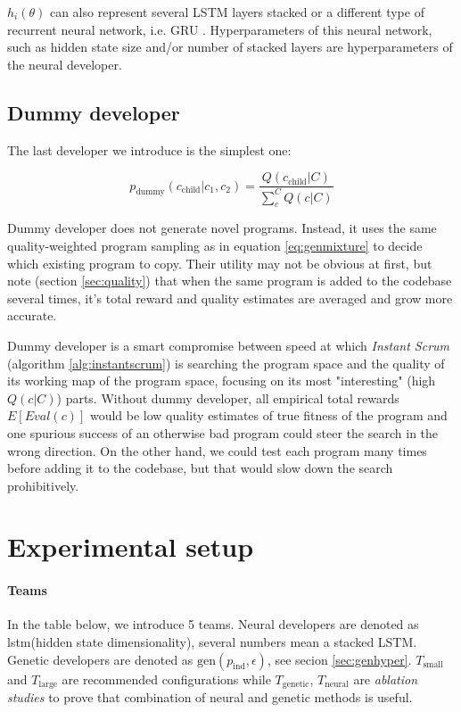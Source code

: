 $h_i(\theta)$ can also represent several LSTM layers stacked or a different type of recurrent neural network, i.e. GRU \cite{gru}.
Hyperparameters of this neural network, such as hidden state size and/or number of stacked layers are hyperparameters of the neural developer.  

\newpage \subsection{Dummy developer}

The last developer we introduce is the simplest one:

\begin{equation}
    p_\text{dummy}(c_\text{child}|c_1,c_2) = 
    \frac{Q(c_\text{child}|C)}{\sum\limits_{c}^{C} Q(c|C)} 
    \label{eq:dummy}
\end{equation}

Dummy developer does not generate novel programs.
Instead, it uses the same quality-weighted program sampling as in equation \ref{eq:genmixture} to decide which existing program to copy.
Their utility may not be obvious at first, but note (section \ref{sec:quality}) that when the same program is added to the codebase several times, it's total reward and quality estimates are averaged and grow more accurate.

Dummy developer is a smart compromise between speed at which \emph{Instant Scrum} (algorithm \ref{alg:instantscrum}) is searching the program space and the quality of its working map of the program space, focusing on its most "interesting" (high $Q(c|C)$) parts. 
Without dummy developer, all empirical total rewards $E[Eval(c)]$ would be low quality estimates of true fitness of the program and one spurious success of an otherwise bad program could steer the search in the wrong direction.
On the other hand, we could test each program many times before adding it to the codebase, but that would slow down the search prohibitively. 

\newpage
\section{Experimental setup}
\label{sec:experiments}

\paragraph{Teams}

In the table below, we introduce 5 teams.
Neural developers are denoted as lstm(hidden state dimensionality), several numbers mean a stacked LSTM.
Genetic developers are denoted as $\text{gen}(p_\text{ind},\epsilon)$, see secion \ref{sec:genhyper}.
$T_\text{small}$ and $T_\text{large}$ are recommended configurations while $T_\text{genetic}$, $T_\text{neural}$ are \emph{ablation studies} to prove that combination of neural and genetic methods is useful.

